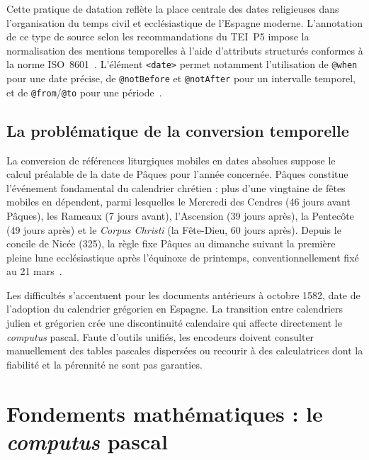 \documentclass[final, fra]{anthology-ch}     %
\begin{document}
Cette pratique de datation reflète la place centrale des dates religieuses dans l'organisation du temps civil et ecclésiastique de l'Espagne moderne. L'annotation de ce type de source selon les recommandations du TEI~P5 impose la normalisation des mentions temporelles à l'aide d'attributs structurés conformes à la norme ISO~8601~\cite{burnard2014}. L'élément \texttt{<date>} permet notamment l'utilisation de \texttt{@when} pour une date précise, de \texttt{@notBefore} et \texttt{@notAfter} pour un intervalle temporel, et de \texttt{@from}/\texttt{@to} pour une période~\cite{tei2025}.

\subsection{La problématique de la conversion temporelle} \label{sec:conversion}

La conversion de références liturgiques mobiles en dates absolues suppose le calcul préalable de la date de Pâques pour l'année concernée. Pâques constitue l'événement fondamental du calendrier chrétien : plus d'une vingtaine de fêtes mobiles en dépendent, parmi lesquelles le Mercredi des Cendres (46 jours avant Pâques), les Rameaux (7 jours avant), l'Ascension (39 jours après), la Pentecôte (49 jours après) et le \textit{Corpus Christi} (la Fête-Dieu, 60 jours après). Depuis le concile de Nicée (325), la règle fixe Pâques au dimanche suivant la première pleine lune ecclésiastique après l'équinoxe de printemps, conventionnellement fixé au 21 mars~\cite{mosshammer2008}.

Les difficultés s'accentuent pour les documents antérieurs à octobre 1582, date de l'adoption du calendrier grégorien en Espagne. La transition entre calendriers julien et grégorien crée une discontinuité calendaire qui affecte directement le \textit{computus} pascal. Faute d'outils unifiés, les encodeurs doivent consulter manuellement des tables pascales dispersées ou recourir à des calculatrices dont la fiabilité et la pérennité ne sont pas garanties.



\section{Fondements mathématiques : le \textit{computus} pascal} \label{sec:computus}
\end{document}
